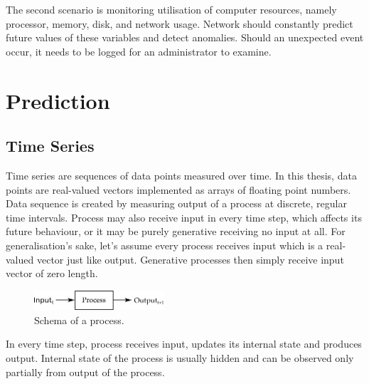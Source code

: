 \documentclass[12pt,oneside]{fithesis2}
\begin{document}
\par %
The second scenario is monitoring utilisation of computer resources, namely processor, memory, disk, and network usage. Network should constantly predict future values of these variables and detect anomalies. Should an unexpected event occur, it needs to be logged for an administrator to examine.
\par

\chapter{Prediction}
\section{Time Series}
Time series are sequences of data points measured over time. In this thesis, data points are real-valued vectors implemented as arrays of floating point numbers. Data sequence is created by measuring output of a process at discrete, regular time intervals. %
Process may also receive input in every time step, which affects its future behaviour, or it may be purely generative receiving no input at all. For generalisation's sake, let's assume every process receives input which is a real-valued vector just like output. Generative processes then simply receive input vector of zero length.
	\begin{figure}[ht]
		\centering
		\includegraphics[width=182px]{process.png}
		\caption{Schema of a process.}
	\end{figure}
In every time step, process receives input, updates its internal state and produces output. Internal state of the process is usually hidden and can be observed only partially from output of the process. %
\end{document}
